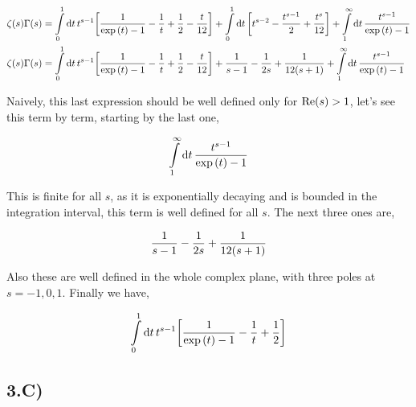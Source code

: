 \begin{align*}
    \zeta(s)\Gamma\qty(s)&=\int\limits_0^1\dd{t}t^{s-1}\qty[\frac{1}{\exp\qty(t)-1}-\frac1t+\frac12-\frac{t}{12}]+\int\limits_0^1\dd{t}\qty[t^{s-2}-\frac{t^{s-1}}{2}+\frac{t^s}{12}]+\int\limits_1^\infty\dd{t}\frac{t^{s-1}}{\exp\qty(t)-1}\\
    \zeta(s)\Gamma\qty(s)&=\int\limits_0^1\dd{t}t^{s-1}\qty[\frac{1}{\exp\qty(t)-1}-\frac1t+\frac12-\frac{t}{12}]+\frac{1}{s-1}-\frac{1}{2s}+\frac{1}{12\qty(s+1)}+\int\limits_1^\infty\dd{t}\frac{t^{s-1}}{\exp\qty(t)-1}   
\end{align*}

Naively, this last expression should be well defined only for $\textnormal{Re}\qty(s)>1$, let's see this term by term, starting by the last one,

\begin{align*}
    \int\limits_1^\infty\dd{t}\frac{t^{s-1}}{\exp\qty(t)-1}
\end{align*}

This is finite for all $s$, as it is exponentially decaying and is bounded in the integration interval, this term is well defined for all $s$. 
The next three ones are,

\begin{align*}
    \frac{1}{s-1}-\frac{1}{2s}+\frac{1}{12\qty(s+1)}
\end{align*}

Also these are well defined in the whole complex plane, with three poles at $s=-1,0,1$. Finally we have,

\begin{align*}
    \int\limits_0^1\dd{t}t^{s-1}\qty[\frac{1}{\exp\qty(t)-1}-\frac1t+\frac12]
\end{align*}

\subsection{3.C)}